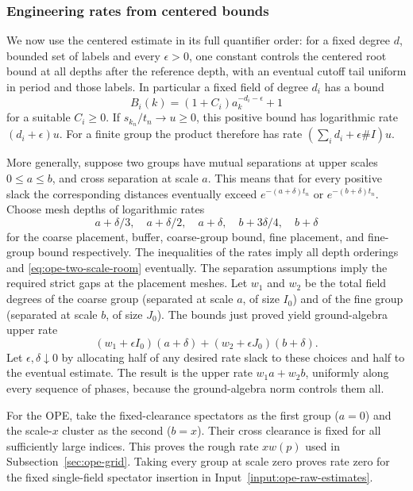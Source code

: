 \subsubsection{Engineering rates from centered bounds}
We now use the centered estimate in its full quantifier order: for a
fixed degree $d$, bounded set of labels and every $\epsilon>0$, one
constant controls the centered root bound at all depths after the
reference depth, with an eventual cutoff tail uniform in period and
those labels. In particular a fixed field of degree $d_i$ has a bound
\[
 B_i(k)=(1+C_i)a_k^{-d_i-\epsilon}+1
\]
for a suitable $C_i\geq0$. If $s_{k_n}/t_n\to u\geq0$, this positive
bound has logarithmic rate $(d_i+\epsilon)u$. For a finite group the
product therefore has rate $(\sum_i d_i+\epsilon\#I)u$.

More generally, suppose two groups have mutual separations at upper
scales $0\leq a\leq b$, and cross separation at scale $a$. This means that
for every positive slack the corresponding distances eventually exceed
$e^{-(a+\delta)t_n}$ or $e^{-(b+\delta)t_n}$. Choose mesh depths of
logarithmic rates
\[
 a+\delta/3,\quad a+\delta/2,\quad a+\delta,
 \quad b+3\delta/4,\quad b+\delta
\]
for the coarse placement, buffer, coarse-group bound, fine placement,
and fine-group bound respectively. The inequalities of the rates imply
all depth orderings and \eqref{eq:ope-two-scale-room} eventually. The
separation assumptions imply the required strict gaps at the placement
meshes. Let $w_1$ and $w_2$ be the total field degrees of the coarse
group (separated at scale $a$, of size $I_0$) and of the fine group
(separated at scale $b$, of size $J_0$). The bounds just proved yield
ground-algebra upper rate
\[
 (w_1+\epsilon I_0)(a+\delta)
                  +(w_2+\epsilon J_0)(b+\delta).
\]
Let $\epsilon,\delta\downarrow0$ by allocating half of any desired
rate slack to these choices and half to the eventual estimate. The
result is the upper rate $w_1a+w_2b$, uniformly along every sequence of
phases, because the ground-algebra norm controls them all.

For the OPE, take the fixed-clearance spectators as the first group
($a=0$) and the scale-$x$ cluster as the second ($b=x$).
Their cross clearance is fixed for all sufficiently large indices.
This proves the rough rate $xw(p)$ used in Subsection~\ref{sec:ope-grid}.
Taking every group at scale zero proves rate zero for the fixed
single-field spectator insertion in Input~\ref{input:ope-raw-estimates}.

